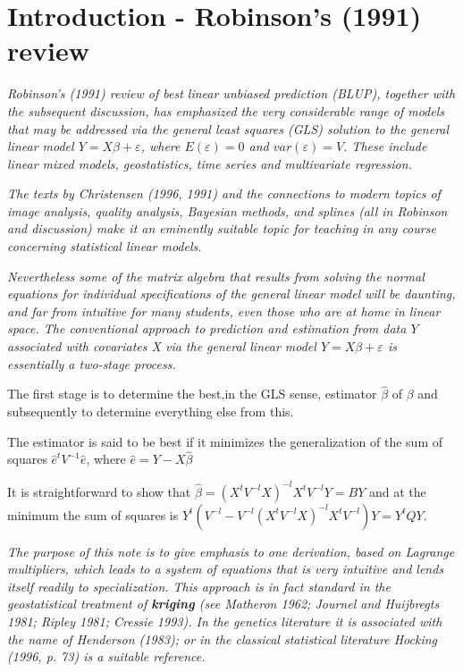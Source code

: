 \documentclass[Main.tex]{subfiles}
\begin{document}
\section{Introduction - Robinson's (1991) review}
\emph{ Robinson's (1991) review of best linear unbiased prediction (BLUP), together with the subsequent discussion, has emphasized the very considerable range of models that may be addressed via the general least squares (GLS) solution to the general linear model $Y = X\beta + \varepsilon$, where $E(\varepsilon) = 0$ and $var(\varepsilon) = V$. These include linear mixed models, geostatistics, time series and multivariate regression.}


\emph{ The texts by Christensen (1996, 1991) and the connections to modern topics of image analysis, quality analysis, Bayesian methods, and splines (all in Robinson and discussion) make it an eminently suitable topic for teaching in any course concerning statistical linear models. }

\bigskip 
\emph{Nevertheless some of the matrix algebra that results from solving the normal equations for individual specifications of the general linear model will be daunting, and far from intuitive for many students, even those who are at home in linear space. The conventional approach to prediction and estimation from data $Y$ associated with covariates X via the general linear model $Y = X\beta + \varepsilon$ is essentially a two-stage process.}

The first stage is to determine the best,in the GLS sense, estimator $\hat{\beta}$ of $\beta$ and subsequently to determine everything else from this.

The estimator is said to be best if it minimizes the generalization of the sum of squares $\hat{e}^{t}V^{-1}\hat{e}$, where $\hat{e} = Y- X\hat{\beta}$

\newpage

It is straightforward to show that $\hat{\beta} = (X^tV^{-l}X)^{-l}X^tV^{-l}Y = BY$ and at the minimum the sum of squares is $Y^{t} (V^{-l}  - V^{-l}(X^tV^{-l}X)^{-l}X^tV^{-l})Y = Y^{t}QY$.\\
\bigskip

\emph{The purpose of this note is to give emphasis to one derivation, based on Lagrange multipliers, which leads to a system of equations that is very intuitive and lends itself readily to specialization. This approach is in fact standard in the geostatistical treatment of \textbf{kriging} (see Matheron 1962; Journel and Huijbregts 1981; Ripley 1981; Cressie 1993). In the genetics literature it is associated with the name of Henderson (1983); or in the classical statistical literature Hocking (1996, p. 73) is a suitable reference.}
\end{document}
